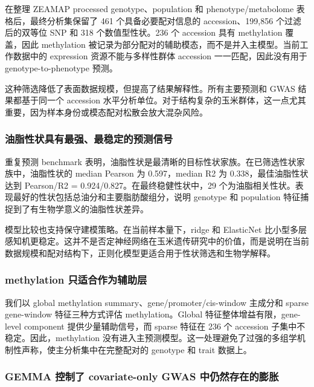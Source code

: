 \documentclass[
]{article}
\begin{document}
在整理 ZEAMAP processed genotype、population 和 phenotype/metabolome
表格后，最终分析集保留了 461 个具备必要配对信息的 accession、199,856
个过滤后的双等位 SNP 和 318 个数值型性状。236 个 accession 具有
methylation 覆盖，因此 methylation
被记录为部分配对的辅助模态，而不是并入主模型。当前工作数据中的
expression 资源不能与多样性群体 accession 一一匹配，因此没有用于
genotype-to-phenotype 预测。

这种筛选降低了表面数据规模，但提高了结果解释性。所有主要预测和 GWAS
结果都基于同一个 accession
水平分析单位。对于结构复杂的玉米群体，这一点尤其重要，因为样本身份或模态配对松散会放大混杂风险。

\subsubsection{油脂性状具有最强、最稳定的预测信号}\label{ux6cb9ux8102ux6027ux72b6ux5177ux6709ux6700ux5f3aux6700ux7a33ux5b9aux7684ux9884ux6d4bux4fe1ux53f7}

重复预测 benchmark
表明，油脂性状是最清晰的目标性状家族。在已筛选性状家族中，油脂性状的
median Pearson 为 0.597，median R2 为 0.338，最佳油脂性状达到 Pearson/R2
= 0.924/0.827。在最终稳健性状中，29
个为油脂相关性状。表现最好的性状包括总油分和主要脂肪酸组分，说明
genotype 和 population 特征捕捉到了有生物学意义的油脂性状差异。

模型比较也支持保守建模策略。在当前样本量下，ridge 和 ElasticNet
比小型多层感知机更稳定。这并不是否定神经网络在玉米遗传研究中的价值，而是说明在当前数据规模和配对结构下，正则化模型更适合用于性状筛选和生物学解释。

\subsubsection{methylation
只适合作为辅助层}\label{methylation-ux53eaux9002ux5408ux4f5cux4e3aux8f85ux52a9ux5c42}

我们以 global methylation summary、gene/promoter/cis-window 主成分和
sparse gene-window 特征三种方式评估 methylation。Global
特征整体增益有限，gene-level component 提供少量辅助信号，而 sparse
特征在 236 个 accession 子集中不稳定。因此，methylation
没有进入主预测模型。这一处理避免了过强的多组学机制性声称，使主分析集中在完整配对的
genotype 和 trait 数据上。

\subsubsection{GEMMA 控制了 covariate-only GWAS
中仍然存在的膨胀}\label{gemma-ux63a7ux5236ux4e86-covariate-only-gwas-ux4e2dux4ecdux7136ux5b58ux5728ux7684ux81a8ux80c0}
\end{document}
